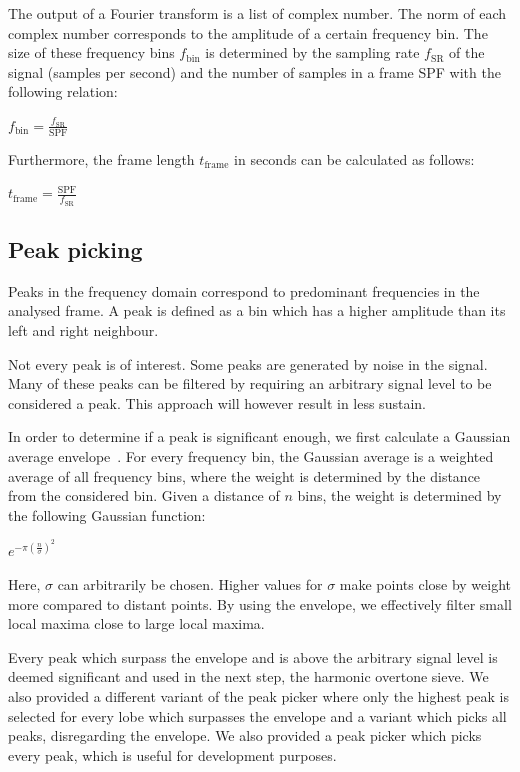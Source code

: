 \documentclass[10pt,twocolumn]{article}
\begin{document}
The output of a Fourier transform is a list of complex number. The norm of each complex number corresponds to the amplitude of a certain frequency bin. The size of these frequency bins $f_{\text{bin}}$ is determined by the sampling rate $f_{\text{SR}}$ of the signal (samples per second) and the number of samples in a frame SPF with the following relation:
\begin{center}
    $f_{\text{bin}} = \frac{f_{\text{SR}}}{\text{SPF}}$
\end{center}
Furthermore, the frame length $t_\text{frame}$ in seconds can be calculated as follows:
\begin{center}
    $t_{\text{frame}} = \frac{\text{SPF}}{f_{\text{SR}}}$
\end{center}

\subsection{Peak picking}
Peaks in the frequency domain correspond to predominant frequencies in the analysed frame. A peak is defined as a bin which has a higher amplitude than its left and right neighbour.

Not every peak is of interest. Some peaks are generated by noise in the signal. Many of these peaks can be filtered by requiring an arbitrary signal level to be considered a peak. This approach will however result in less sustain.

In order to determine if a peak is significant enough, we first calculate a Gaussian average envelope~\cite{gauss}. For every frequency bin, the Gaussian average is a weighted average of all frequency bins, where the weight is determined by the distance from the considered bin. Given a distance of $n$ bins, the weight is determined by the following Gaussian function:
\begin{center}
    $e^{-\pi(\frac{n}{\sigma})^2}$
\end{center}
Here, $\sigma$ can arbitrarily be chosen. Higher values for $\sigma$ make points close by weight more compared to distant points. By using the envelope, we effectively filter small local maxima close to large local maxima.

Every peak which surpass the envelope and is above the arbitrary signal level is deemed significant and used in the next step, the harmonic overtone sieve. We also provided a different variant of the peak picker where only the highest peak is selected for every lobe which surpasses the envelope and a variant which picks all peaks, disregarding the envelope. We also provided a peak picker which picks every peak, which is useful for development purposes.
\end{document}
